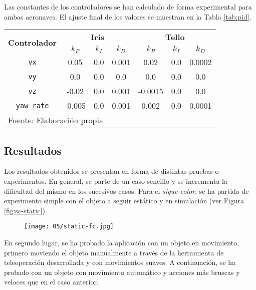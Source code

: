 \documentclass[../main.tex]{subfiles}
\begin{document}


Las constantes de los controladores se han calculado de forma experimental para ambas aeronaves. El ajuste final de los valores se muestran en la Tabla \ref{tab:pid}.

\begin{table}[H]
	{\begin{tabular}{|c|c|c|c|c|c|c|}
		\hline
		\multirow{2}{*}{\textbf{Controlador}} & \multicolumn{3}{c|}{\textbf{Iris}} & \multicolumn{3}{c|}{\textbf{Tello}} \\
		\cline{2-7}
        & \textbf{$k_P$} & \textbf{$k_I$} & \textbf{$k_D$} & \textbf{$k_P$} & \textbf{$k_I$} & \textbf{$k_D$} \\
		\hline
		\lstinline{vx} & 0.05 & 0.0 & 0.001 & 0.02 & 0.0 & 0.0002 \\
        \hline
        \lstinline{vy} & 0.0 & 0.0 & 0.0 & 0.0 & 0.0 & 0.0 \\
        \hline
		\lstinline{vz} & -0.02 & 0.0 & 0.001 & -0.0015 & 0.0 & 0.0 \\
        \hline
		\lstinline{yaw_rate} & -0.005 & 0.0 & 0.001 & 0.002 & 0.0 & 0.0001 \\
        \hline
		\multicolumn{7}{l}{Fuente: Elaboración propia}
	\end{tabular}}
\end{table}

\subsection*{Resultados}
Los resultados obtenidos se presentan en forma de distintas pruebas o experimentos. En general, se parte de un caso sencillo y se incrementa la dificultad del mismo en los sucesivos casos. Para el \emph{sigue-color}, se ha partido de experimento simple con el objeto a seguir estático y en simulación (ver Figura \ref{fig:sc-static}).

\begin{figure}[!ht]
 	{\texttt{[image: 05/static-fc.jpg]}}
\end{figure}

\newpage
En segundo lugar, se ha probado la aplicación con un objeto en movimiento, primero moviendo el objeto manualmente a través de la herramienta de teleoperación desarrollada y con movimientos suaves. A continuación, se ha probado con un objeto con movimiento automático y acciones más bruscas y veloces que en el caso anterior.
\end{document}
